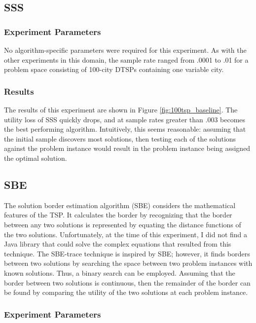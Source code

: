 \subsection{SSS} 

\subsubsection{Experiment Parameters}  No algorithm-specific parameters were required for this experiment.  As with the other experiments in this domain, the sample rate ranged from .0001 to .01 for a problem space consisting of 100-city DTSPs containing one variable city.

\subsubsection{Results} The results of this experiment are shown in Figure \ref{fig:100tsp_baseline}.  The utility loss of SSS quickly drops, and at sample rates greater than .003 becomes the best performing algorithm.  Intuitively, this seems reasonable:  assuming that the initial sample discovers most solutions, then testing each of the solutions against the problem instance would result in the problem instance being assigned the optimal solution.


\subsection{SBE} 

The solution border estimation algorithm (SBE) considers the mathematical features of the TSP.  It calculates the border by recognizing that the border between any two solutions is represented by equating the distance functions of the two solutions.  Unfortunately, at the time of this experiment, I did not find a Java library that could solve the complex equations that resulted from this technique.  The SBE-trace technique is inspired by SBE; however, it finds borders between two solutions by searching the space between two problem instances with known solutions.  Thus, a binary search can be employed.  Assuming that the border between two solutions is continuous, then the remainder of the border can be found by comparing the utility of the two solutions at each problem instance. 

\subsubsection{Experiment Parameters}  


